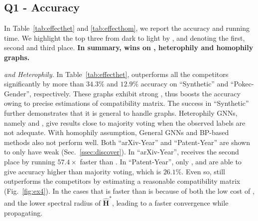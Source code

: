 \subsection{Q1 - Accuracy}
In Table~\ref{tab:effecthet} and \ref{tab:effecthom}, we report the accuracy and running time. 
We highlight the top three from dark to light by \goldc{~}, \silverc{~} and \bronzec{~} denoting the first, second and third place.
\textbf{In summary, \method wins on \xophily, heterophily and homophily graphs.}




\textit{\xophily and Heterophily.}
In Table~\ref{tab:effecthet}, \method outperforms all the competitors significantly by more than $34.3\%$ and $12.9\%$ accuracy on ``Synthetic'' and ``Pokec-Gender'', respectively.
These graphs exhibit strong \nef, thus \method boosts the accuracy owing to precise estimations of compatibility matrix. 
The success in ``Synthetic'' further demonstrates that it is general to handle \xophily graphs.
Heterophily GNNs, namely \mixhop and \gprgnn, give results close to majority voting when the observed labels are not adequate. 
With homophily assumption, General GNNs and BP-based methods also not perform well.
Both ``arXiv-Year'' and ``Patent-Year'' are shown to only have weak \nef (Sec.~\ref{ssec:discover}).
In ``arXiv-Year'', \method receives the second place by running $57.4\times$ faster than \mixhop.
In ``Patent-Year'', only \method, \appnp and \mixhop are able to give accuracy higher than majority voting, which is $26.1\%$. 
Even so, \method still outperforms the competitors by estimating a reasonable compatibility matrix (Fig.~\ref{fig:ex4}).
In the cases that \method is faster than \methodhom is because of both the low cost of \methodest, and the lower spectral radius of $\hat{\boldsymbol{H}}^{*}$, leading to a faster convergence while propagating.

